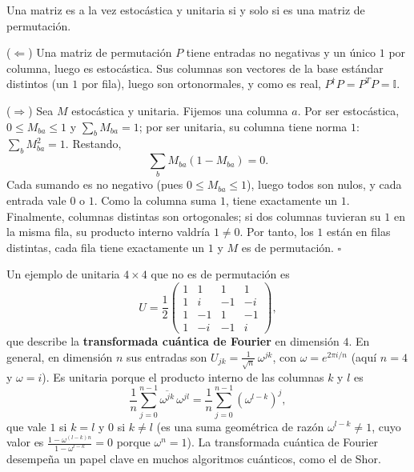 \documentclass[11pt, a4paper, twoside, openright]{report}
\begin{document}
\begin{tcolorbox}[colback=teal!5!white,colframe=teal!75!black,title=\textbf{Proposición: Estocásticas y unitarias a la vez}]
Una matriz es a la vez estocástica y unitaria si y solo si es una matriz de permutación.
\end{tcolorbox}

\begin{tcolorbox}[colback=gray!5!white,colframe=gray!75!black,title=\textbf{Demostración}]
($\Leftarrow$) Una matriz de permutación $P$ tiene entradas no negativas y un único $1$ por columna, luego es estocástica. Sus columnas son vectores de la base estándar distintos (un $1$ por fila), luego son ortonormales, y como es real, $P^\dagger P = P^TP = \mathbb{I}$.

($\Rightarrow$) Sea $M$ estocástica y unitaria. Fijemos una columna $a$. Por ser estocástica, $0 \leq M_{ba} \leq 1$ y $\sum_b M_{ba} = 1$; por ser unitaria, su columna tiene norma $1$: $\sum_b M_{ba}^2 = 1$. Restando,
\[ \sum_{b} M_{ba}(1 - M_{ba}) = 0. \]
Cada sumando es no negativo (pues $0 \le M_{ba} \le 1$), luego todos son nulos, y cada entrada vale $0$ o $1$. Como la columna suma $1$, tiene exactamente un $1$. Finalmente, columnas distintas son ortogonales; si dos columnas tuvieran su $1$ en la misma fila, su producto interno valdría $1 \neq 0$. Por tanto, los $1$ están en filas distintas, cada fila tiene exactamente un $1$ y $M$ es de permutación. \hfill $\square$
\end{tcolorbox}

\noindent Un ejemplo de unitaria $4\times 4$ que no es de permutación es
\[
U = \frac12\begin{pmatrix} 1 & 1 & 1 & 1 \\ 1 & i & -1 & -i \\ 1 & -1 & 1 & -1 \\ 1 & -i & -1 & i \end{pmatrix},
\]
que describe la \textbf{transformada cuántica de Fourier} en dimensión $4$. En general, en dimensión $n$ sus entradas son $U_{jk} = \frac{1}{\sqrt n}\,\omega^{jk}$, con $\omega = e^{2\pi i/n}$ (aquí $n = 4$ y $\omega = i$). Es unitaria porque el producto interno de las columnas $k$ y $l$ es
\[ \frac1n \sum_{j=0}^{n-1} \overline{\omega^{jk}}\,\omega^{jl} = \frac1n\sum_{j=0}^{n-1} \left(\omega^{l-k}\right)^j, \]
que vale $1$ si $k = l$ y $0$ si $k \neq l$ (es una suma geométrica de razón $\omega^{l-k} \neq 1$, cuyo valor es $\frac{1 - \omega^{(l-k)n}}{1-\omega^{l-k}} = 0$ porque $\omega^n = 1$). La transformada cuántica de Fourier desempeña un papel clave en muchos algoritmos cuánticos, como el de Shor.
\end{document}
